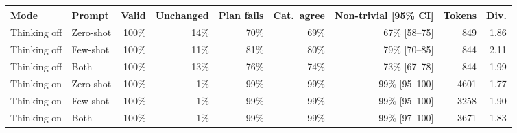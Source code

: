 \begin{tabular}{llrrrrrrr}
\toprule
Mode & Prompt & Valid & Unchanged & Plan fails & Cat.\ agree & Non-trivial [95\% CI] & Tokens & Div. \\
\midrule
Thinking off & Zero-shot & 100\% & 14\% & 70\% & 69\% & 67\% [58--75] & 849 & 1.86 \\
Thinking off & Few-shot & 100\% & 11\% & 81\% & 80\% & 79\% [70--85] & 844 & 2.11 \\
Thinking off & Both & 100\% & 13\% & 76\% & 74\% & 73\% [67--78] & 844 & 1.99 \\
Thinking on & Zero-shot & 100\% & 1\% & 99\% & 99\% & 99\% [95--100] & 4601 & 1.77 \\
Thinking on & Few-shot & 100\% & 1\% & 99\% & 99\% & 99\% [95--100] & 3258 & 1.90 \\
Thinking on & Both & 100\% & 1\% & 99\% & 99\% & 99\% [97--100] & 3671 & 1.83 \\
\bottomrule
\end{tabular}
